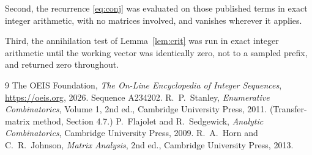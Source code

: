 \documentclass[11pt,a4paper]{article}
\theoremstyle{plain}
\theoremstyle{definition}
\begin{document}
Second, the recurrence \eqref{eq:conj} was evaluated on those published terms in exact
integer arithmetic, with no matrices involved, and vanishes wherever it applies.

Third, the annihilation test of Lemma~\ref{lem:crit} was run in exact integer arithmetic
until the working vector was identically zero, not to a sampled prefix, and returned zero
throughout.

\begin{thebibliography}{9}
 The OEIS Foundation, \emph{The On-Line Encyclopedia of Integer
Sequences}, \url{https://oeis.org}, 2026. Sequence A234202.
 R.~P.~Stanley, \emph{Enumerative Combinatorics}, Volume 1, 2nd ed.,
Cambridge University Press, 2011. (Transfer-matrix method, Section 4.7.)
 P.~Flajolet and R.~Sedgewick, \emph{Analytic Combinatorics}, Cambridge
University Press, 2009.
 R.~A.~Horn and C.~R.~Johnson, \emph{Matrix Analysis}, 2nd ed., Cambridge
University Press, 2013.
\end{thebibliography}
\end{document}
